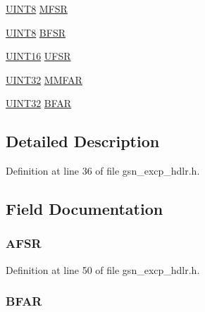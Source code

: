 \begin{DoxyCompactItemize}
\item 
\hyperlink{a00660_gab27e9918b538ce9d8ca692479b375b6a}{UINT8} \hyperlink{a00070_a4063c5155a72383a23b224d48946c543}{MFSR}
\item 
\hyperlink{a00660_gab27e9918b538ce9d8ca692479b375b6a}{UINT8} \hyperlink{a00070_ab724270db66160e3624be5804eb0a6be}{BFSR}
\item 
\hyperlink{a00660_ga09f1a1fb2293e33483cc8d44aefb1eb1}{UINT16} \hyperlink{a00070_ac28249da0687f4c0cccb204d118021e5}{UFSR}
\item 
\hyperlink{a00660_gae1e6edbbc26d6fbc71a90190d0266018}{UINT32} \hyperlink{a00070_a15d381a8eeb8f08429531da2f388315c}{MMFAR}
\item 
\hyperlink{a00660_gae1e6edbbc26d6fbc71a90190d0266018}{UINT32} \hyperlink{a00070_a4c0904c8d68eabeb362e9851e87789d1}{BFAR}
\end{DoxyCompactItemize}


\subsection{Detailed Description}


Definition at line 36 of file gsn\_\-excp\_\-hdlr.h.



\subsection{Field Documentation}
\hypertarget{a00070_a3a4be2ea17237bed3ec11da27552ce96}{
\subsubsection[{AFSR}]{ {\bf AFSR}}}
\label{a00070_a3a4be2ea17237bed3ec11da27552ce96}


Definition at line 50 of file gsn\_\-excp\_\-hdlr.h.

\hypertarget{a00070_a4c0904c8d68eabeb362e9851e87789d1}{
\subsubsection[{BFAR}]{ {\bf BFAR}}}
\label{a00070_a4c0904c8d68eabeb362e9851e87789d1}


